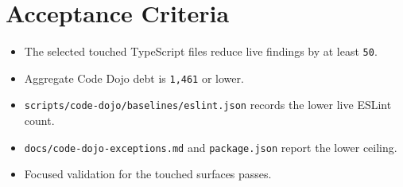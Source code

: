 \section{Acceptance Criteria}\label{record-227-acceptance-criteria}

\begin{itemize}
\tightlist
\item
  The selected touched TypeScript files reduce live findings by at least \texttt{5\allowbreak{}0}.
\item
  Aggregate Code Dojo debt is \texttt{1\allowbreak{},\allowbreak{}4\allowbreak{}6\allowbreak{}1} or lower.
\item
  \texttt{s\allowbreak{}c\allowbreak{}r\allowbreak{}i\allowbreak{}p\allowbreak{}t\allowbreak{}s\allowbreak{}/\allowbreak{}c\allowbreak{}o\allowbreak{}d\allowbreak{}e\allowbreak{}-\allowbreak{}d\allowbreak{}o\allowbreak{}j\allowbreak{}o\allowbreak{}/\allowbreak{}b\allowbreak{}a\allowbreak{}s\allowbreak{}e\allowbreak{}l\allowbreak{}i\allowbreak{}n\allowbreak{}e\allowbreak{}s\allowbreak{}/\allowbreak{}e\allowbreak{}s\allowbreak{}l\allowbreak{}i\allowbreak{}n\allowbreak{}t\allowbreak{}.\allowbreak{}j\allowbreak{}s\allowbreak{}o\allowbreak{}n} records the lower live ESLint count.
\item
  \texttt{d\allowbreak{}o\allowbreak{}c\allowbreak{}s\allowbreak{}/\allowbreak{}c\allowbreak{}o\allowbreak{}d\allowbreak{}e\allowbreak{}-\allowbreak{}d\allowbreak{}o\allowbreak{}j\allowbreak{}o\allowbreak{}-\allowbreak{}e\allowbreak{}x\allowbreak{}c\allowbreak{}e\allowbreak{}p\allowbreak{}t\allowbreak{}i\allowbreak{}o\allowbreak{}n\allowbreak{}s\allowbreak{}.\allowbreak{}m\allowbreak{}d} and \texttt{p\allowbreak{}a\allowbreak{}c\allowbreak{}k\allowbreak{}a\allowbreak{}g\allowbreak{}e\allowbreak{}.\allowbreak{}j\allowbreak{}s\allowbreak{}o\allowbreak{}n} report the lower ceiling.
\item
  Focused validation for the touched surfaces passes.
\end{itemize}

